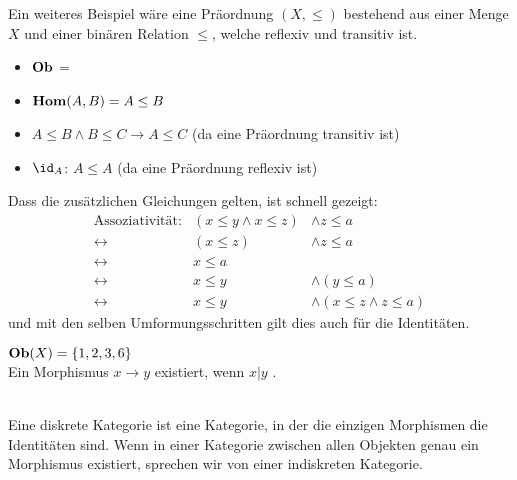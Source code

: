 \documentclass{article}
\begin{document}
		 \begin{bsp}
		 Ein weiteres Beispiel w\"are eine Pr\"aordnung \( \left( X, \leq \right) \) bestehend aus einer Menge \( X \) und einer bin\"aren Relation \( \leq \), welche reflexiv und transitiv ist.
		 
		 \begin{itemize}
			 \item \( \mathbf{Ob}  \) = \BN
			 \item \(   \mathbf{Hom } (A,B) = A \leq B \)
			 \item \( A \leq B \wedge B \leq  C \rightarrow A \leq C \)  (da eine Pr\"aordnung transitiv ist) 
			 \item \( \id_A \): \( A \leq A \) (da eine  Pr\"aordnung reflexiv ist)
		 \end{itemize}
			 Dass die zus\"atzlichen Gleichungen gelten, ist schnell gezeigt:
			 \begin{eqnarray*}
			  \text{Assoziativit\"at:} &  ( x \leq y \wedge x \leq z ) & \wedge z \leq a \\
					 \leftrightarrow & (x \leq z ) & \wedge  z \leq a \\
					 \leftrightarrow & x \leq a & \\
					 \leftrightarrow & 	x \leq y  & \wedge  (y \leq a) \\
					 \leftrightarrow &   x \leq y & \wedge  (x \leq z  \wedge  z \leq a )
			 \end{eqnarray*}
			 und mit den selben Umformungsschritten gilt dies auch f\"ur die Identit\"aten.
		\end{bsp}
		
		\begin{bsp}
		
		  \cite[Beispiel 2.2.30]{Bra} 
		 \(  \mathbf{Ob} (X) = \left\lbrace 1,2,3,6 \right\rbrace \) \\
		 Ein Morphismus \(x   \to y \) existiert, wenn \( x \vert y\) . \\
		 
		   
		\end{bsp} 
		 
	 	\begin{defi}
	 	 \cite[Beispiel 2.2.31]{Bra} \\
	 		Eine diskrete Kategorie ist eine Kategorie, in der die einzigen Morphismen die Identit\"aten sind.
	 		Wenn in einer Kategorie zwischen allen Objekten genau ein Morphismus existiert, sprechen wir von einer indiskreten Kategorie.
	 	\end{defi}	
	 		
\end{document}
